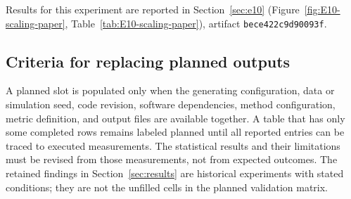 Results for this experiment are reported in Section~\ref{sec:e10} (Figure~\ref{fig:E10-scaling-paper}, Table~\ref{tab:E10-scaling-paper}), artifact \texttt{bece422c9d90093f}.

\subsection{Criteria for replacing planned outputs}
A planned slot is populated only when the generating configuration, data or
simulation seed, code revision, software dependencies, method configuration,
metric definition, and output files are available together. A table that has
only some completed rows remains labeled planned until all reported entries
can be traced to executed measurements. The statistical results and their
limitations must be revised from those measurements, not from expected
outcomes. The retained findings in Section~\ref{sec:results} are historical
experiments with stated conditions; they are not the unfilled cells in the
planned validation matrix.
